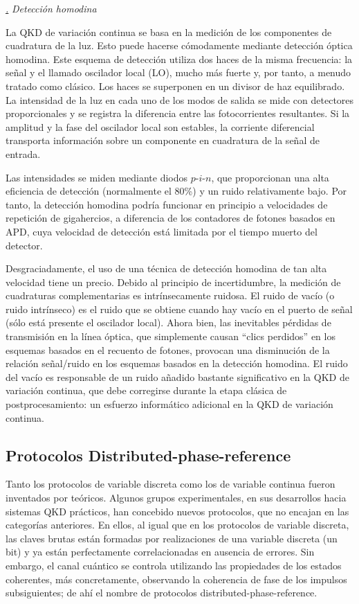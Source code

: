 \documentclass[a4paper,11pt]{book} %
\numberwithin{equation}{chapter}
\def\subsubiContadorIt{\par\addtocounter{subsubsection}{1}\underline{\it\thesubsubsection.}\hskip0.5cm \setcounter{subsubsubsectionIt}{0}}
\newcommand{\SubsubiIt}[1]{
		\subsubiContadorIt \textit{#1}
	}
\newcounter{subsubsubsectionIt}[subsubsection]
\begin{document}
		\SubsubiIt{Detección homodina}

La QKD de variación continua se basa en la medición de los componentes de cuadratura de la luz. Esto puede hacerse cómodamente mediante detección óptica homodina. Este esquema de detección utiliza dos haces de la misma frecuencia: la señal y el llamado oscilador local (LO), mucho más fuerte y, por tanto, a menudo tratado como clásico. Los haces se superponen en un divisor de haz equilibrado. La intensidad de la luz en cada uno de los modos de salida se mide con detectores proporcionales y se registra la diferencia entre las fotocorrientes resultantes. Si la amplitud y la fase del oscilador local son estables, la corriente diferencial transporta información sobre un componente en cuadratura de la señal de entrada. 

Las intensidades se miden mediante diodos $p$-$i$-$n$, que proporcionan una alta eficiencia de detección (normalmente el 80\%) y un ruido relativamente bajo. Por tanto, la detección homodina podría funcionar en principio a velocidades de repetición de gigahercios, a diferencia de los contadores de fotones basados en APD, cuya velocidad de detección está limitada por el tiempo muerto del detector.

Desgraciadamente, el uso de una técnica de detección homodina de tan alta velocidad tiene un precio. Debido al principio de incertidumbre, la medición de cuadraturas complementarias es intrínsecamente ruidosa. El ruido de vacío (o ruido intrínseco) es el ruido que se obtiene cuando hay vacío en el puerto de señal (sólo está presente el oscilador local). Ahora bien, las inevitables pérdidas de transmisión en la línea óptica, que simplemente causan ``clics perdidos'' en los esquemas basados en el recuento de fotones, provocan una disminución de la relación señal/ruido en los esquemas basados en la detección homodina. El ruido del vacío es responsable de un ruido añadido bastante significativo en la QKD de variación continua, que debe corregirse durante la etapa clásica de postprocesamiento: un esfuerzo informático adicional en la QKD de variación continua.


		\subsection{Protocolos Distributed-phase-reference} \label{sec_subsec_QKD_phase}
		
Tanto los protocolos de variable discreta como los de variable continua fueron inventados por teóricos. Algunos grupos experimentales, en sus desarrollos hacia sistemas QKD prácticos, han concebido nuevos protocolos, que no encajan en las categorías anteriores. En ellos, al igual que en los protocolos de variable discreta, las claves brutas están formadas por realizaciones de una variable discreta (un bit) y ya están perfectamente correlacionadas en ausencia de errores. Sin embargo, el canal cuántico se controla utilizando las propiedades de los estados coherentes, más concretamente, observando la coherencia de fase de los impulsos subsiguientes; de ahí el nombre de protocolos distributed-phase-reference.
\end{document}
